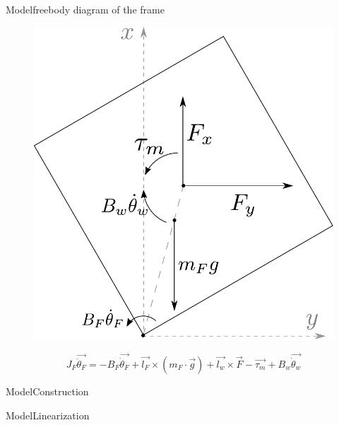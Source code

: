 \begin{frame}{Model}{freebody diagram of the frame}
	\begin{figure}[H]
		\includegraphics[scale=0.40]{Pictures/freeBodyFrame.pdf}
	\end{figure}
	\begin{displaymath}
	\si{J_F \vec{\ddot{\theta}_F} =}
	\si{-B_F \vec{\dot{\theta}_F} + \vec{l_F} \times (m_F\cdot \vec{g}) + \vec{l_w} \times \vec{F} - \vec{\tau_m} + B_w \vec{\dot{\theta}_w}}
	\end{displaymath}
	
	
\end{frame}

\begin{frame}{Model}{Construction}
	\begin{figure}[H]
		\centering
	\end{figure}
\end{frame}

\begin{frame}{Model}{Linearization}
	\begin{figure}[H]
		\centering
	\end{figure}
\end{frame}

